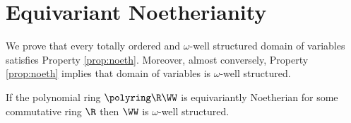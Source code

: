 



\section{Equivariant Noetherianity} %
\label{sec:equiv noeth}

We prove that every totally ordered and $\omega$-well structured domain of variables satisfies  
Property \ref{prop:noeth}.
Moreover, almost conversely, Property \ref{prop:noeth} implies that domain of variables is 
$\omega$-well structured.

\begin{theorem} \label{thm:wqo}
If the polynomial ring $\polyring \R \WW$ is equivariantly Noetherian for some commutative ring $\R$ then
$\WW$ is $\omega$-well structured.
\end{theorem}

